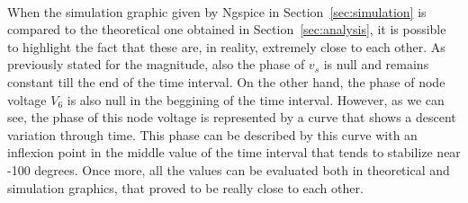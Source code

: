 \paragraph{}
When the simulation graphic given by Ngspice in Section~\ref{sec:simulation} is compared to the theoretical one obtained in Section~\ref{sec:analysis}, it is possible to highlight the fact that these are, in reality, extremely close to each other. As previously stated for the magnitude, also the phase of $v_s$ is null and remains constant till the end of the time interval. On the other hand, the phase of node voltage $V_6$ is also null in the beggining of the time interval. However, as we can see, the phase of this node voltage is represented by a curve that shows a descent variation through time. This phase can be described by this curve with an inflexion point in the middle value of the time interval that tends to stabilize near -100 degrees. Once more, all the values can be evaluated both in theoretical and simulation graphics, that proved to be really close to each other.















